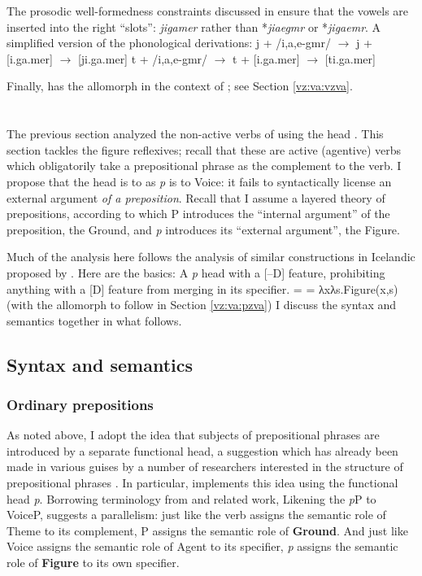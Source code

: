 The prosodic well-formedness constraints discussed in \cite{kastner18nllt} ensure that the vowels are inserted into the right ``slots'': \emph{jigamer} rather than *\emph{jiaegmr} or *\emph{jigaemr}. A simplified version of the phonological derivations:
\pex
	\a j + /i,a,e-gmr/ $\rightarrow$ j + [i.ga.mer] $\rightarrow$ [ji.ga.mer]
	\a t + /i,a,e-gmr/ $\rightarrow$ t + [i.ga.mer] $\rightarrow$ [ti.ga.mer]
\xe

Finally, {\vz} has the allomorph {\thit} in the context of {\va}; see Section \ref{vz:va:vzva}.


\section{\pz} \label{vz:pz}
The previous section analyzed the non-active verbs of {\tnif} using the head {\vz}. This section tackles the figure reflexives; recall that these are active (agentive) verbs which obligatorily take a prepositional phrase as the complement to the verb. I propose that the head {\pz} is to {\vz} as \textit{p} is to Voice: it fails to syntactically license an external argument \emph{of a preposition}. Recall that I assume a layered theory of prepositions, according to which P introduces the ``internal argument'' of the preposition, the Ground, and \textit{p} introduces its ``external argument'', the Figure.

Much of the analysis here follows the analysis of similar constructions in Icelandic proposed by \cite{wood15springer}. Here are the basics:
\pex \textbf{\pz}
	\a A \textit{p} head with a [--D] feature, prohibiting anything with a [D] feature from merging in its specifier.
    \a \denote{\pz} =  = λxλs.Figure(x,s)
	\a {\pz} {\lra} {\tnif} \hfill (with the allomorph {\thit} to follow in Section \ref{vz:va:pzva})
\xe
I discuss the syntax and semantics together in what follows.

	\subsection{Syntax and semantics} \label{vz:pz:syn}	
		\subsubsection{Ordinary prepositions}
As noted above, I adopt the idea that subjects of prepositional phrases are introduced by a separate functional head, a suggestion which has already been made in various guises by a number of researchers interested in the structure of prepositional phrases \citep{vanriemsdijk90,rooryck96,koopman97,gehrke08phd,dendikken03,dendikken10}. In particular, \cite{svenonius03,svenonius07,svenonius10} implements this idea using the functional head \emph{p}. Borrowing terminology from \cite{talmy78} and related work, Likening the \emph{p}P to VoiceP, \cite{wood14nllt,wood15springer} suggests a parallelism: just like the verb assigns the semantic role of Theme to its complement, P assigns the semantic role of \textbf{Ground}. And just like Voice assigns the semantic role of Agent to its specifier, \emph{p} assigns the semantic role of \textbf{Figure} to its own specifier.

